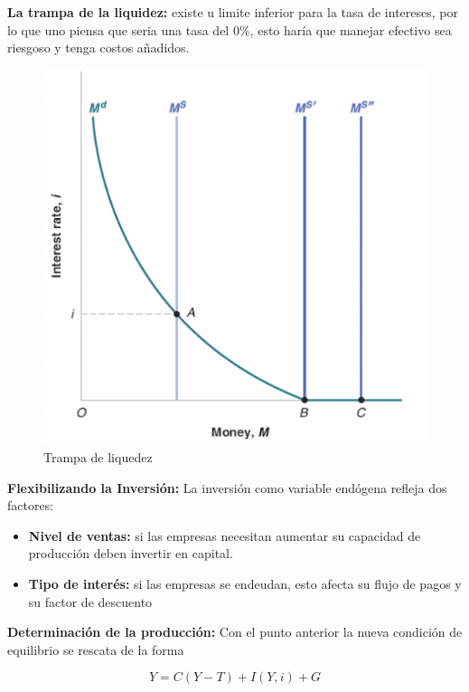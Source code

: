 \textbf{La trampa de la liquidez:} existe u limite inferior para la tasa de intereses, por lo que uno piensa que seria una tasa del $0\%$, esto haría que manejar efectivo sea riesgoso y tenga costos añadidos. 

\begin{figure}[H]
    \centering
    \includegraphics[scale = 0.5]{Images/trampa de liquidez.png}
    \caption{Trampa de liquedez}
    \label{fig:trampa}
\end{figure}
\textbf{Flexibilizando la Inversión:}
La inversión como variable endógena refleja dos factores: 

\begin{itemize}
    \item \textbf{Nivel de ventas:} si las empresas necesitan aumentar su capacidad de producción deben invertir en capital.
    \item \textbf{Tipo de interés:} si las empresas se endeudan, esto afecta su flujo de pagos y su factor de descuento
\end{itemize}

\textbf{Determinación de la producción:} Con el punto anterior la nueva condición de equilibrio se rescata de la forma

\begin{equation}
    Y = C(Y-T)+I(Y,i)+G
\end{equation}

